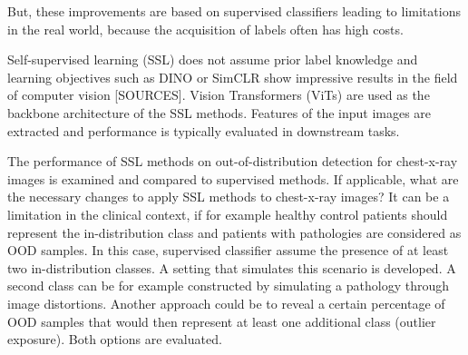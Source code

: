 But, these improvements are based on supervised classifiers leading to limitations in the real world, because the acquisition of labels often has high costs. 
\par
Self-supervised learning (SSL) does not assume prior label knowledge and learning objectives such as DINO \citep{Caron2021} or SimCLR \citep{Chen2020} show impressive results in the field of computer vision [SOURCES].
Vision Transformers (ViTs) are used as the backbone architecture of the SSL methods.
Features of the input images are extracted and performance is typically evaluated in downstream tasks.
\par
The performance of SSL methods on out-of-distribution detection for chest-x-ray images is examined and compared to supervised methods.
If applicable, what are the necessary changes to apply SSL methods to chest-x-ray images?
It can be a limitation in the clinical context, if for example healthy control patients should represent the in-distribution class and patients with pathologies are considered as OOD samples.
In this case, supervised classifier assume the presence of at least two in-distribution classes.
A setting that simulates this scenario is developed. 
A second class can be for example constructed by simulating a pathology through image distortions.
Another approach could be to reveal a certain percentage of OOD samples that would then represent at least one additional class (outlier exposure).
Both options are evaluated.